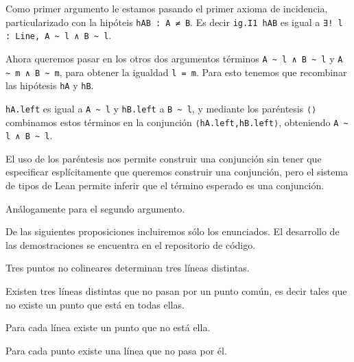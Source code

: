 \begin{enumerate}[label=L.\arabic*, topsep=0mm]
	      Como primer argumento le estamos pasando el primer axioma de incidencia,
	      particularizado con la hipóteis \lstinline{hAB : A ≠ B}. Es decir
	      \lstinline{ig.I1 hAB} es igual a \lstinline{∃! l : Line, A ~ l ∧ B ~ l}.

	      Ahora queremos pasar en los otros dos argumentos términos
	      \lstinline{A ~ l ∧ B ~ l} y \lstinline{A ~ m ∧ B ~ m}, para obtener la
	      igualdad \lstinline{l = m}. Para esto tenemos que recombinar las hipótesis
	      \lstinline{hA} y \lstinline{hB}.

	      \lstinline{hA.left} es igual a \lstinline{A ~ l} y \lstinline{hB.left} a
	      \lstinline{B ~ l}, y mediante los paréntesis \lstinline{⟨⟩} combinamos
	      estos términos en la conjunción \lstinline{⟨hA.left,hB.left⟩}, obteniendo
	      \lstinline{A ~ l ∧ B ~ l}.

	      El uso de los paréntesis nos permite construir una conjunción sin tener
	      que especificar esplícitamente que queremos construir una conjunción, pero
	      el sistema de tipos de Lean permite inferir que el término esperado es una
	      conjunción.

	      Análogamente para el segundo argumento.
\end{enumerate}


De las siguientes proposiciones incluiremos sólo los enunciados. El desarrollo
de las demostraciones se encuentra en el repositorio de código.


\begin{prop}
	Tres puntos no colineares determinan tres líneas distintas.
\end{prop}



\begin{prop}
	Existen tres líneas distintas que no pasan por un punto común, es decir
	tales que no existe un punto que está en todas ellas.
\end{prop}


\begin{prop}
	Para cada línea existe un punto que no está ella.
\end{prop}


\begin{prop}
	Para cada punto existe una línea que no pasa por él.
\end{prop}








